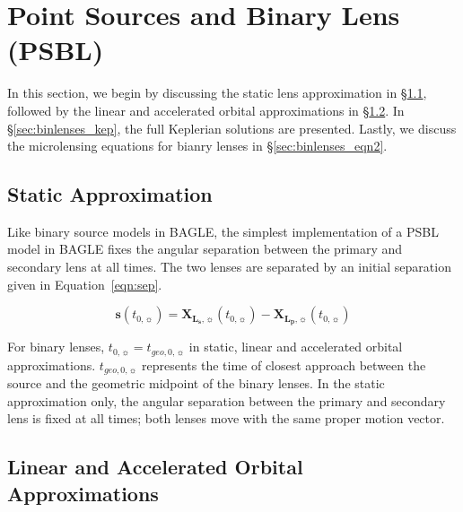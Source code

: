 \documentclass[twocolumn]{aastex701}
\newcommand{\vect}[1]{\boldsymbol{#1}}
\newcommand{\tnot}{t_{0,\sun}}
\newcommand{\Xlpvec}{\vect{X}_{\boldsymbol{L_p},\sun}}
\newcommand{\Xlsvec}{\vect{X}_{\boldsymbol{L_s},\sun}}
\begin{document}
\section{Point Sources and Binary Lens (PSBL) 
\label{sec:binlenses}}



In this section, we begin by discussing the static lens approximation in \S\ref{sec:binlenses_static}, followed by the linear and accelerated orbital approximations in \S\ref{sec:binlenses_lin}. In \S\ref{sec:binlenses_kep}, the full Keplerian solutions are presented. Lastly, we discuss the microlensing equations for bianry lenses in \S\ref{sec:binlenses_eqn2}.

\subsection{Static Approximation}
\label{sec:binlenses_static}

Like binary source models in BAGLE, the simplest implementation of a PSBL model in BAGLE fixes the angular separation between the primary and secondary lens at all times. The two lenses are separated by an initial separation given in Equation~\ref{eqn:sep}.

\begin{equation}
    \label{eqn:sep}
    \vect{s}(\tnot) = \Xlsvec(\tnot) - \Xlpvec(\tnot)
\end{equation}

For binary lenses, $\tnot=t_{geo, 0, \sun}$ in static, linear and accelerated orbital approximations. $t_{geo, 0, \sun}$ represents the time of closest approach between the source and the geometric midpoint of the binary lenses. In the static approximation only, the angular separation between the primary and secondary lens is fixed at all times; both lenses move with the same proper motion vector. 

\subsection{Linear and Accelerated Orbital Approximations}
\label{sec:binlenses_lin}
\end{document}

